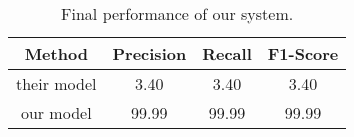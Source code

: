 \begin{table}[!htbp]
\caption{Final performance of our system. }
\label{t:results} 
\centering
\begin{tabular}{|c|c|c|c|}
\hline

Method      &    Precision &     Recall &     F1-Score \\ \hline
their model &     3.40     &      3.40  &      3.40    \\ \hline
our model   &    99.99     &     99.99  &     99.99    \\ \hline


\end{tabular}
\end{table}
